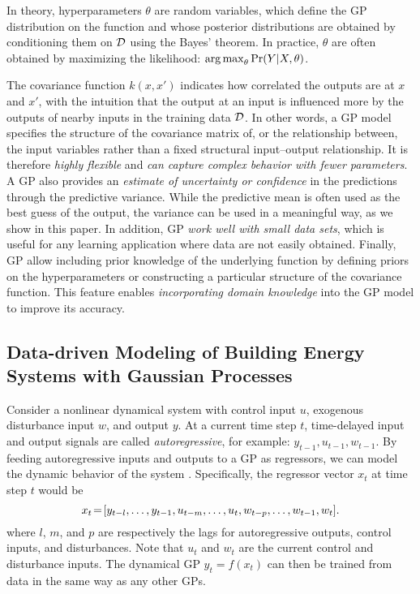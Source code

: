 In theory, hyperparameters $\theta$ are random variables, which define the GP distribution on the function and whose posterior distributions are obtained by conditioning them on $\mathcal{D}$ using the Bayes' theorem.
In practice, $\theta$ are often obtained by maximizing the likelihood: \(\operatorname*{arg\,max}_\theta \Pr(Y \vert X, \theta)\).

The covariance function \(k(x,x')\) indicates how correlated the outputs are at \(x\) and \(x'\), with the intuition that the output at an input is influenced more by the outputs of nearby inputs in the training data $\mathcal{D}$.
In other words, a GP model specifies the structure of the covariance matrix of, or the relationship between, the input variables rather than a fixed structural input--output relationship.
It is therefore \emph{highly flexible} and \emph{can capture complex behavior with fewer parameters}.
A GP also provides an \emph{estimate of uncertainty or confidence} in the predictions through the predictive variance.  While the predictive mean is often used as the best guess of the output, the variance can be used in a meaningful way, as we show in this paper.
In addition, GP \emph{work well with small data sets}, which is useful for any learning application where data are not easily obtained.
Finally, GP allow including prior knowledge of the underlying function by defining priors on the hyperparameters or constructing a particular structure of the covariance function.  This feature enables \emph{incorporating domain knowledge} into the GP model to improve its accuracy.


\subsection{Data-driven Modeling of Building Energy Systems with Gaussian Processes}
\label{sec:modeling:building}


Consider a nonlinear dynamical system with control input \(u\), exogenous disturbance input \(w\), and output \(y\).
At a current time step $t$, time-delayed input and output signals are called \emph{autoregressive}, for example: $y_{t-1}, u_{t-1}, w_{t-1}$.
By feeding autoregressive inputs and outputs to a GP as regressors, we can model the dynamic behavior of the system \cite{Kocijan2016}.
Specifically, the regressor vector $x_{t}$ at time step $t$ would be
\begin{equation*}
x_{t}\!=\![y_{t-l}, \dots, y_{t-1}, u_{t-m}, \dots, u_t, w_{t-p}, \dots, w_{t-1}, w_t] \text.
\end{equation*}
where \(l\), \(m\), and \(p\) are respectively the lags for autoregressive outputs, control inputs, and disturbances.
Note that \(u_t\) and \(w_t\) are the current control and disturbance inputs.
The dynamical GP
\begin{math}
y_{t} = f(x_t)
\end{math}
can then be trained from data in the same way as any other GPs.

